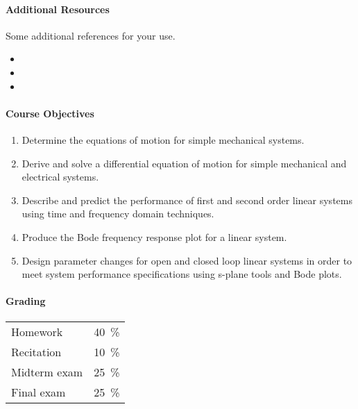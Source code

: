 \documentclass[11pt, reqno]{article}   	%
\begin{document}
\paragraph{Additional Resources} 
Some additional references for your use.
\begin{itemize}
    \item {}
    \item {}
    \item {}
\end{itemize}

\paragraph{Course Objectives}
\begin{enumerate}
    \item Determine the equations of motion for simple mechanical systems.
    \item Derive and solve a differential equation of motion for simple mechanical and electrical systems.
    \item Describe and predict the performance of first and second order linear systems using time and frequency domain techniques.
    \item Produce the Bode frequency response plot for a linear system.
    \item Design parameter changes for open and closed loop linear systems in order to meet system performance specifications using s-plane tools and Bode plots.
\end{enumerate}

\paragraph{Grading}
\begin{tabular}[t]{lr}
    Homework & \SI{40}{\percent} \\
    Recitation & \SI{10}{\percent}\\
    Midterm exam & \SI{25}{\percent}\\
    Final exam & \SI{25}{\percent}
\end{tabular}
\end{document}
